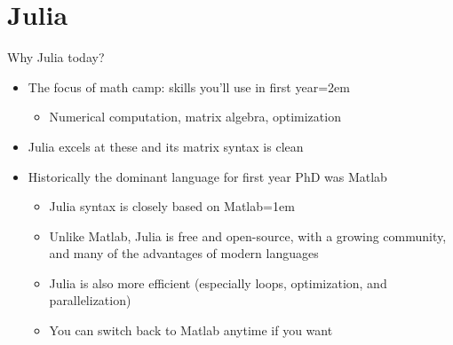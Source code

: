 \documentclass[handout]{beamer}
\begin{document}
\section{Julia}

\begin{frame}{Why Julia today?}
\begin{itemize}
    \item The focus of math camp: skills you'll use in first year\itemsep=2em
    \begin{itemize}
      \item Numerical computation, matrix algebra, optimization
    \end{itemize}
    \item Julia excels at these and its matrix syntax is clean
    \item<2-> Historically the dominant language for first year PhD was Matlab
    \begin{itemize}
        \item Julia syntax is closely based on Matlab\itemsep=1em
        \item Unlike Matlab, Julia is free and open-source, with a growing community, and many of the advantages of modern languages
        \item Julia is also more efficient (especially loops, optimization, and parallelization)
        \item You can switch back to Matlab anytime if you want
    \end{itemize}
\end{itemize}
\end{frame}
\end{document}
